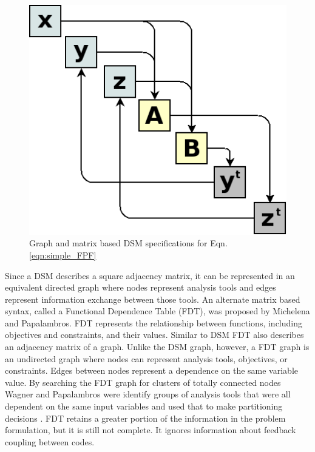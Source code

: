     \begin{figure}[!hbp]
        \begin{center}
        \includegraphics[width=.75\textwidth]{images/dsm_simple}
        \caption{Graph and matrix based DSM specifications for Eqn. \ref{eqn:simple_FPF} \label{fig:dsm_simple}}
        \end{center}
    \end{figure}

    Since a DSM describes a square adjacency matrix, it can be represented in an equivalent directed graph where nodes represent analysis tools and 
    edges represent information exchange between those tools. An alternate matrix based syntax, called a 
    Functional Dependence Table (FDT), was proposed by Michelena and Papalambros. 
    FDT represents the relationship between functions, including objectives and constraints, and their values\cite{Michelena1997}. Similar to DSM
    FDT also describes an adjacency matrix of a graph. Unlike the DSM graph, however, a FDT graph is an undirected 
    graph where nodes can represent analysis tools, objectives, or constraints. Edges between nodes represent a dependence on the same 
    variable value. By searching the FDT graph for clusters of totally connected nodes Wagner and Papalambros were identify groups of 
    analysis tools that were all dependent on the same input variables and used that to make partitioning decisions \cite{Wagner1993}. FDT retains 
    a greater portion of the information in the problem formulation, but it is still not complete. It ignores information about feedback coupling 
    between codes. 

